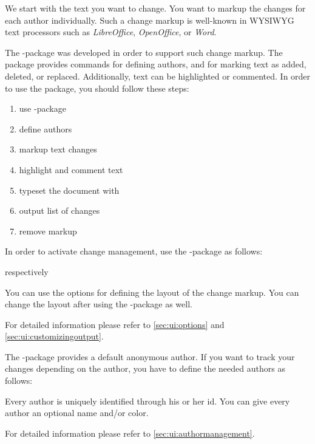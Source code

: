 We start with the text you want to change.
You want to markup the changes for each author individually.
Such a change markup is well-known in WYSIWYG text processors such as \emph{LibreOffice}, \emph{OpenOffice}, or \emph{Word}.

The -package was developed in order to support such change markup.
The package provides commands for defining authors, and for marking text as added, deleted, or replaced.
Additionally, text can be highlighted or commented.
In order to use the package, you should follow these steps:

\begin{enumerate}
	\item use -package
	\item define authors
	\item markup text changes
	\item highlight and comment text
	\item typeset the document with 
	\item output list of changes
	\item remove markup
\end{enumerate}



In order to activate change management, use the -package as follows:


respectively


You can use the options for defining the layout of the change markup.
You can change the layout after using the -package as well.

For detailed information please refer to \autoref{sec:ui:options} and \autoref{sec:ui:customizingoutput}.



The -package provides a default anonymous author.
If you want to track your changes depending on the author, you have to define the needed authors as follows:


Every author is uniquely identified through his or her id.
You can give every author an optional name and/or color.

For detailed information please refer to \autoref{sec:ui:authormanagement}.


